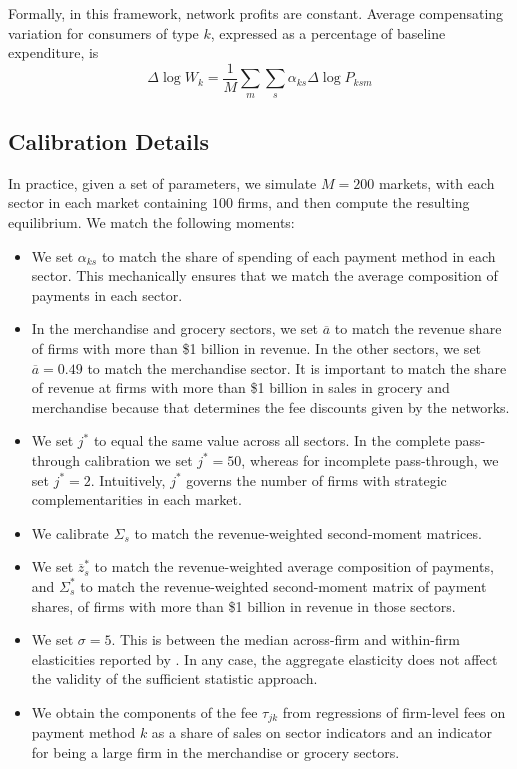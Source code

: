 \documentclass[main.tex]{subfiles}
\begin{document}
Formally, in this framework, network profits are constant.
Average compensating variation for consumers of type $k$, expressed as a percentage of baseline expenditure, is
\[
\Delta\log W_{k}=\frac{1}{M}\sum_{m}\sum_{s}\alpha_{ks}\Delta\log P_{ksm}
\]

\subsection{Calibration Details}

In practice, given a set of parameters, we simulate $M=200$ markets, with each sector in each market containing $100$ firms, and then compute the resulting equilibrium.
We match the following moments:

\begin{itemize}
\item We set $\alpha_{ks}$ to match the share of spending of each payment
method in each sector.
This mechanically ensures that we match the average composition of payments in each sector.

\item In the merchandise and grocery sectors, we set $\overline{a}$ to match the revenue share of firms with more than \$1 billion in revenue. In the other sectors, we set $\overline{a}=0.49$ to match the merchandise sector. It is important to match the share of revenue at firms with more than \$1 billion in sales in grocery and merchandise because that determines the fee discounts given by the networks.
\item We set $j^*$ to equal the same value across all sectors. In the complete pass-through calibration we set $j^*=50$, whereas for incomplete pass-through, we set $j^*=2$. Intuitively, $j^*$ governs the number of firms with strategic complementarities in each market.
\item We calibrate $\Sigma_{s}$ to match the revenue-weighted second-moment matrices.
\item We set $\overline{z}_{s}^{*}$ to match the revenue-weighted average composition of payments, and $\Sigma_{s}^{*}$ to match the revenue-weighted second-moment matrix of payment shares, of firms with more than \$1 billion in revenue in those sectors.
\item We set $\sigma=5$. This is between the median across-firm and within-firm elasticities reported by \citet{Hottman.etal2016}. In any case, the aggregate elasticity does not affect the validity of the sufficient statistic approach.
\item We obtain the components of the fee $\tau_{jk}$ from regressions of firm-level fees on payment method $k$ as a share of sales on sector indicators and an indicator for being a large firm in the merchandise or grocery sectors.
\end{itemize}
\end{document}

